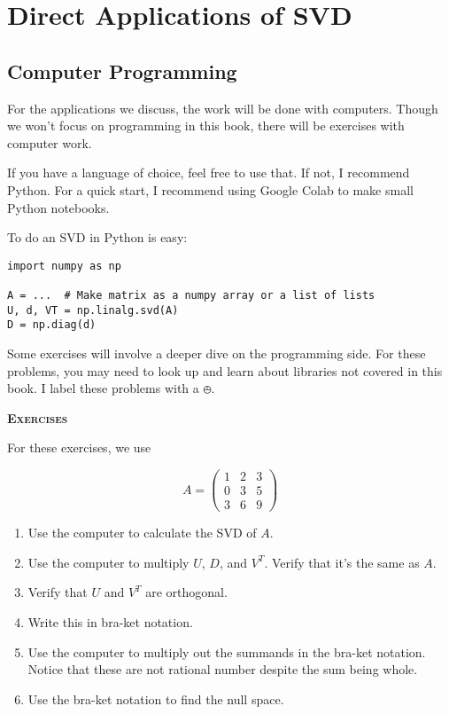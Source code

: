 \documentclass{amsbook}
\begin{document}
\chapter{Direct Applications of SVD}

\section{Computer Programming}
\label{computer_section}

For the applications we discuss, the work will be done with computers.  Though we won't focus on programming in this book, there will be exercises with computer work.

If you have a language of choice, feel free to use that.  If not, I recommend Python.  For a quick start, I recommend using Google Colab to make small Python notebooks.

To do an SVD in Python is easy:

\begin{lstlisting}
import numpy as np

A = ...  # Make matrix as a numpy array or a list of lists
U, d, VT = np.linalg.svd(A)
D = np.diag(d)
\end{lstlisting}

Some exercises will involve a deeper dive on the programming side.  For these problems, you may need to look up and learn about libraries not covered in this book.  I label these problems with a $\obot$.

{\bfseries\scshape\Large Exercises}

For these exercises, we use

$$
A = \left(\begin{array}{ccc} 1 & 2 & 3 \\ 0 & 3 & 5 \\ 3 & 6 & 9 \end{array}\right)
$$

\begin{enumerate}
\item Use the computer to calculate the SVD of $A$.
\item Use the computer to multiply $U$, $D$, and $V^T$.  Verify that it's the same as $A$.
\item Verify that $U$ and $V^T$ are orthogonal.
\item Write this in bra-ket notation.
\item \label{irrational_summands} Use the computer to multiply out the summands in the bra-ket notation.  Notice that these are not rational number despite the sum being whole.
\item Use the bra-ket notation to find the null space.
\end{enumerate}
\end{document}
